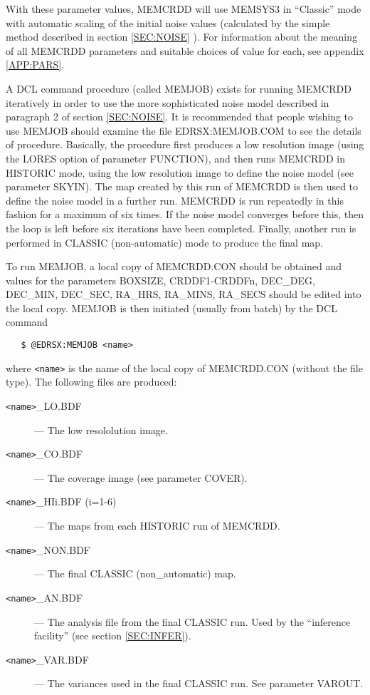 With these parameter values, MEMCRDD will use MEMSYS3 in ``Classic'' mode with
automatic scaling of the initial noise values (calculated by the simple method
described in section \ref {SEC:NOISE} ). For information about the meaning of
all MEMCRDD parameters and suitable choices of value for each, see appendix
\ref {APP:PARS}. 

A DCL command procedure (called MEMJOB) exists for running MEMCRDD iteratively
in order to use the more sophisticated noise model described in paragraph 2 of
section \ref {SEC:NOISE}. It is recommended that people wishing to use MEMJOB
should examine the file EDRSX:MEMJOB.COM to see the details of procedure.
Basically, the procedure first produces a low resolution image (using the LORES
option of parameter FUNCTION), and then runs MEMCRDD in HISTORIC mode, using
the low resolution image to define the noise model (see parameter SKYIN). The
map created by this run of MEMCRDD is then used to define the noise model in a
further run. MEMCRDD is run repeatedly in this fashion for a maximum of six
times. If the noise model converges before this, then the loop is left before
six iterations have been completed. Finally, another run is performed in 
CLASSIC (non-automatic) mode to produce the final map. 

To run MEMJOB, a local copy of MEMCRDD.CON should be obtained and values for
the parameters BOXSIZE, CRDDF1-CRDDFn, DEC\_DEG, DEC\_MIN, DEC\_SEC, RA\_HRS, 
RA\_MINS, RA\_SECS should be edited into the local copy. MEMJOB is then
initiated (usually from batch) by the DCL command 

\begin{verbatim}
   $ @EDRSX:MEMJOB <name>
\end{verbatim}

where \verb+<name>+ is the name of the local copy of MEMCRDD.CON (without the
file type). The following files are produced:

\begin{description}
\item [\verb+<name>+\_LO.BDF] --- The low resololution image.
\item [\verb+<name>+\_CO.BDF] --- The coverage image (see parameter COVER).
\item [\verb+<name>+\_HIi.BDF (i=1-6)] --- The maps from each HISTORIC run of 
MEMCRDD.
\item [\verb+<name>+\_NON.BDF] --- The final CLASSIC (non\_automatic) map.
\item [\verb+<name>+\_AN.BDF] --- The analysis file from the final CLASSIC run.
Used by the ``inference facility'' (see section \ref {SEC:INFER}).
\item [\verb+<name>+\_VAR.BDF] --- The variances used in the final CLASSIC run.
See parameter VAROUT.
\end{description}

